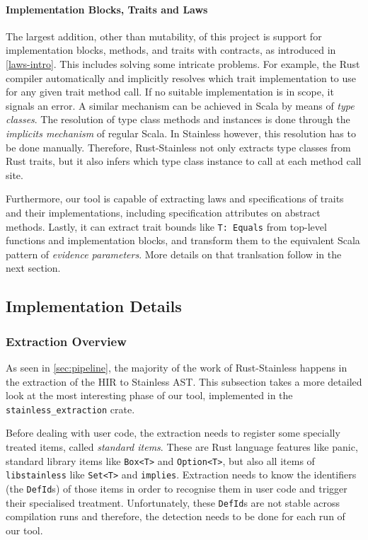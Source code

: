 \paragraph{Implementation Blocks, Traits and Laws}

The largest addition, other than mutability, of this project is support for
implementation blocks, methods, and traits with contracts, as introduced in
\autoref{laws-intro}. This includes solving some intricate problems. For
example, the Rust compiler automatically and implicitly resolves which trait
implementation to use for any given trait method call. If no suitable
implementation is in scope, it signals an error.  A similar mechanism can be
achieved in Scala by means of \emph{type classes}. The resolution of type class
methods and instances is done through the \emph{implicits mechanism} of regular
Scala. In Stainless however, this resolution has to be done manually. Therefore,
Rust-Stainless not only extracts type classes from Rust traits, but it also
infers which type class instance to call at each method call site.

Furthermore, our tool is capable of extracting laws and specifications of traits
and their implementations, including specification attributes on abstract
methods. Lastly, it can extract  trait bounds like \passthrough{\lstinline!T:
Equals!} from top-level functions and implementation blocks, and transform them
to the equivalent Scala pattern of \emph{evidence parameters}. More details on
that tranlsation follow in the next section.



\subsection{Implementation Details}

\subsubsection{Extraction Overview}
\label{sec:extraction-overview}

As seen in \autoref{sec:pipeline}, the majority of the work of Rust-Stainless
happens in the extraction of the HIR to Stainless AST. This subsection takes a
more detailed look at the most interesting phase of our tool, implemented in the
\lstinline!stainless_extraction! crate.

Before dealing with user code, the extraction needs to register some specially
treated items, called \emph{standard items}. These are Rust language features
like panic, standard library items like \lstinline!Box<T>! and
\lstinline!Option<T>!, but also all items of \lstinline!libstainless! like
\lstinline!Set<T>! and \lstinline!implies!. Extraction needs to know the
identifiers (the \lstinline!DefId!s) of those items in order to recognise them
in user code and trigger their specialised treatment. Unfortunately, these
\lstinline!DefId!s are not stable across compilation runs and therefore, the
detection needs to be done for each run of our tool.

